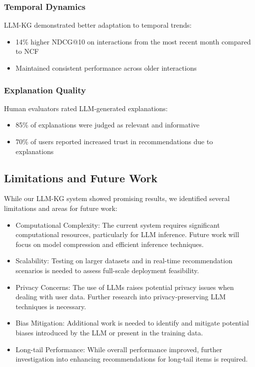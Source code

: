 \documentclass{article}
\begin{document}
\subsubsection{Temporal Dynamics}
LLM-KG demonstrated better adaptation to temporal trends:
\begin{itemize}
    \item 14\% higher NDCG@10 on interactions from the most recent month compared to NCF
    \item Maintained consistent performance across older interactions
\end{itemize}

\subsubsection{Explanation Quality}
Human evaluators rated LLM-generated explanations:
\begin{itemize}
    \item 85\% of explanations were judged as relevant and informative
    \item 70\% of users reported increased trust in recommendations due to explanations
\end{itemize}

\subsection{Limitations and Future Work}

While our LLM-KG system showed promising results, we identified several limitations and areas for future work:

\begin{itemize}
    \item Computational Complexity: The current system requires significant computational resources, particularly for LLM inference. Future work will focus on model compression and efficient inference techniques.
    
    \item Scalability: Testing on larger datasets and in real-time recommendation scenarios is needed to assess full-scale deployment feasibility.
    
    \item Privacy Concerns: The use of LLMs raises potential privacy issues when dealing with user data. Further research into privacy-preserving LLM techniques is necessary.
    
    \item Bias Mitigation: Additional work is needed to identify and mitigate potential biases introduced by the LLM or present in the training data.
    
    \item Long-tail Performance: While overall performance improved, further investigation into enhancing recommendations for long-tail items is required.
\end{itemize}
\end{document}
